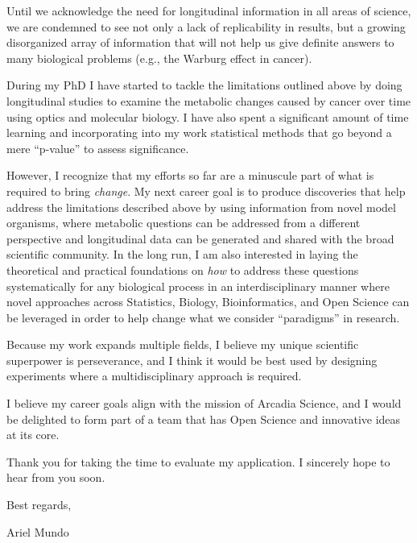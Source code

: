 \documentclass[
  11pt,
]{article}
\begin{document}
Until we acknowledge the need for longitudinal information in all areas
of science, we are condemned to see not only a lack of replicability in
results, but a growing disorganized array of information that will not
help us give definite answers to many biological problems (e.g., the
Warburg effect in cancer).

During my PhD I have started to tackle the limitations outlined above by
doing longitudinal studies to examine the metabolic changes caused by
cancer over time using optics and molecular biology. I have also spent a
significant amount of time learning and incorporating into my work
statistical methods that go beyond a mere ``p-value'' to assess
significance.

However, I recognize that my efforts so far are a minuscule part of what
is required to bring \emph{change}. My next career goal is to produce
discoveries that help address the limitations described above by using
information from novel model organisms, where metabolic questions can be
addressed from a different perspective and longitudinal data can be
generated and shared with the broad scientific community. In the long
run, I am also interested in laying the theoretical and practical
foundations on \emph{how} to address these questions systematically for
any biological process in an interdisciplinary manner where novel
approaches across Statistics, Biology, Bioinformatics, and Open Science
can be leveraged in order to help change what we consider ``paradigms''
in research.

Because my work expands multiple fields, I believe my unique scientific
superpower is perseverance, and I think it would be best used by
designing experiments where a multidisciplinary approach is required.

I believe my career goals align with the mission of Arcadia Science, and
I would be delighted to form part of a team that has Open Science and
innovative ideas at its core.

Thank you for taking the time to evaluate my application. I sincerely
hope to hear from you soon.

Best regards,

Ariel Mundo
\end{document}
